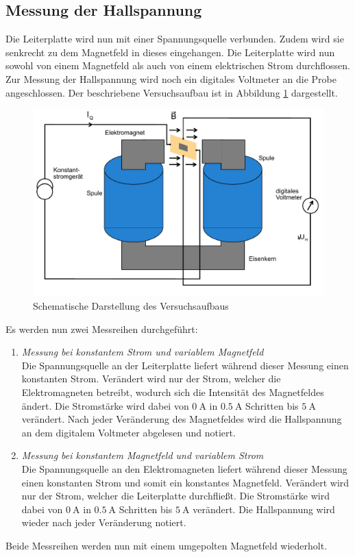 \subsection{Messung der Hallspannung}
Die Leiterplatte wird nun mit einer Spannungsquelle verbunden. Zudem wird sie 
senkrecht zu dem Magnetfeld in dieses eingehangen. Die Leiterplatte wird nun sowohl von einem Magnetfeld
als auch von einem elektrischen Strom durchflossen. Zur Messung der Hallspannung wird noch ein 
digitales Voltmeter an die Probe angeschlossen. Der beschriebene Versuchsaufbau ist in Abbildung
\ref{fig:versuchsanordnung} dargestellt.\\
%
\begin{figure}[H]
    \centering
    \includegraphics[scale = 0.4]{content/1Versuchsaufbau.png}
    \caption{Schematische Darstellung des Versuchsaufbaus}
    \label{fig:versuchsanordnung}
\end{figure}
%
Es werden nun zwei Messreihen durchgeführt:
\begin{enumerate}
    \item \textit{Messung bei konstantem Strom und variablem Magnetfeld}\\
        Die Spannungsquelle an der Leiterplatte liefert während dieser Messung einen konstanten Strom. 
        Verändert wird nur der Strom, welcher die Elektromagneten betreibt, wodurch sich die Intensität
        des Magnetfeldes ändert. Die Stromstärke wird dabei von $\SI{0}{\ampere}$ in $\SI{0.5}{\ampere}$
        Schritten bis $\SI{5}{\ampere}$ verändert. Nach jeder Veränderung des Magnetfeldes wird die 
        Hallspannung an dem digitalem Voltmeter abgelesen und notiert.\\
    \item \textit{Messung bei konstantem Magnetfeld und variablem Strom}\\
        Die Spannungsquelle an den Elektromagneten liefert während dieser Messung einen konstanten Strom und 
        somit ein konstantes Magnetfeld. 
        Verändert wird nur der Strom, welcher die Leiterplatte durchfließt.
        Die Stromstärke wird dabei von $\SI{0}{\ampere}$ in $\SI{0.5}{\ampere}$
        Schritten bis $\SI{5}{\ampere}$ verändert. Die Hallspannung wird wieder nach jeder Veränderung
        notiert.\\
\end{enumerate}
Beide Messreihen werden nun mit einem umgepolten Magnetfeld wiederholt.